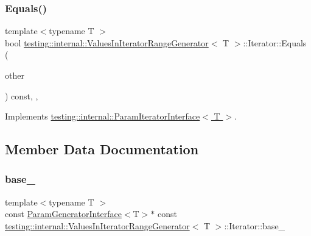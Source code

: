 \subsubsection{\texorpdfstring{Equals()}{Equals()}}
{\footnotesize\ttfamily template$<$typename T $>$ \\
bool \hyperlink{classtesting_1_1internal_1_1ValuesInIteratorRangeGenerator}{testing\+::internal\+::\+Values\+In\+Iterator\+Range\+Generator}$<$ T $>$\+::Iterator\+::\+Equals (\begin{DoxyParamCaption}\item[{const \hyperlink{classtesting_1_1internal_1_1ParamIteratorInterface}{Param\+Iterator\+Interface}$<$ T $>$ \&}]{other }\end{DoxyParamCaption}) const\hspace{0.3cm}{\ttfamily [inline]}, {\ttfamily [override]}, {\ttfamily [virtual]}}



Implements \hyperlink{classtesting_1_1internal_1_1ParamIteratorInterface_a9d811697a752d46f7bd6a0082f9040a3}{testing\+::internal\+::\+Param\+Iterator\+Interface$<$ T $>$}.



\subsection{Member Data Documentation}
\mbox{\label{classtesting_1_1internal_1_1ValuesInIteratorRangeGenerator_1_1Iterator_a904df7e46beda1ce5ac2c0ecd6680e0d}} 
\subsubsection{\texorpdfstring{base\+\_\+}{base\_}}
{\footnotesize\ttfamily template$<$typename T $>$ \\
const \hyperlink{classtesting_1_1internal_1_1ParamGeneratorInterface}{Param\+Generator\+Interface}$<$T$>$$\ast$ const \hyperlink{classtesting_1_1internal_1_1ValuesInIteratorRangeGenerator}{testing\+::internal\+::\+Values\+In\+Iterator\+Range\+Generator}$<$ T $>$\+::Iterator\+::base\+\_\+\hspace{0.3cm}{\ttfamily [private]}}

